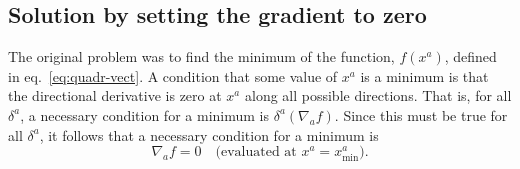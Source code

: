 \documentclass[10pt, a4paper]{article}
\begin{document}
\subsection{Solution by setting the gradient to zero}

The original problem was to find the minimum of the function,
$f(x^a)$, defined in eq.~\eqref{eq:quadr-vect}. A condition that some
value of $x^a$ is a minimum is that the directional derivative is zero
at $x^a$ along all possible directions. That is, for all $\delta^a$, a
necessary condition for a minimum is $\delta^a(\nabla_a f)$. Since this must be
true for all $\delta^a$, it follows that a necessary condition for a
minimum is
\begin{equation*}
  \nabla_a f = 0 \quad\text{(evaluated at $x^a = x^a_\text{min}$)}.
\end{equation*}
\end{document}
